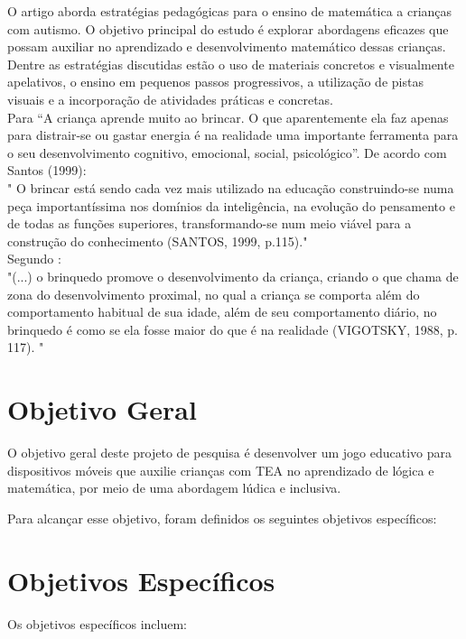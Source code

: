 \documentclass[tcc1,project]{classe_uftex/uftex}
\begin{document}
O artigo \cite{Folostina} aborda estratégias pedagógicas para o ensino de matemática a crianças com autismo. O objetivo principal do estudo é explorar abordagens eficazes que possam auxiliar no aprendizado e desenvolvimento matemático dessas crianças. Dentre as estratégias discutidas estão o uso de materiais concretos e visualmente apelativos, o ensino em pequenos passos progressivos, a utilização de pistas visuais e a incorporação de atividades práticas e concretas.\\

Para \cite{Vygotsky} “A criança aprende muito ao brincar. O que aparentemente ela faz apenas para distrair-se ou gastar energia é na realidade uma importante ferramenta para o seu desenvolvimento cognitivo, emocional, social, psicológico”. De acordo com Santos (1999):\\

" O brincar está sendo cada vez mais utilizado na educação
construindo-se numa peça importantíssima nos domínios da
inteligência, na evolução do pensamento e de todas as funções
superiores, transformando-se num meio viável para a construção do
conhecimento (SANTOS, 1999, p.115)."\\

Segundo \cite{Vygotsky}:\\

"(...) o brinquedo promove o desenvolvimento da criança, criando o que
chama de zona do desenvolvimento proximal, no qual a criança se
comporta além do comportamento habitual de sua idade, além de seu
comportamento diário, no brinquedo é como se ela fosse maior do que
é na realidade (VIGOTSKY, 1988, p. 117). "

\section*{Objetivo Geral}

 O objetivo geral deste projeto de pesquisa é desenvolver um jogo educativo para dispositivos móveis que auxilie crianças com TEA no aprendizado de lógica e matemática, por meio de uma abordagem lúdica e inclusiva.

Para alcançar esse objetivo, foram definidos os seguintes objetivos específicos:

\section*{Objetivos Específicos}

Os objetivos específicos incluem:
\end{document}
